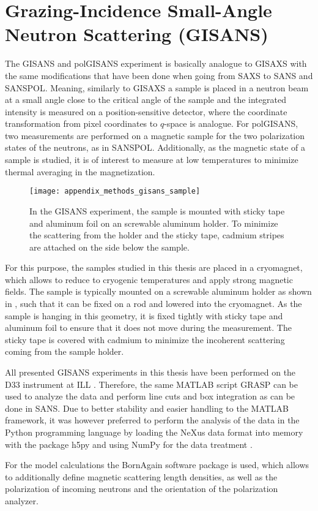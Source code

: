 \documentclass[\main/dresen_thesis.tex]{subfiles}
\begin{document}
  \section{Grazing-Incidence Small-Angle Neutron Scattering (GISANS)}
    \label{ch:methods:gisans}
    The GISANS and polGISANS experiment is basically analogue to GISAXS with the same modifications that have been done when going from SAXS to SANS and SANSPOL.
    Meaning, similarly to GISAXS a sample is placed in a neutron beam at a small angle close to the critical angle of the sample and the integrated intensity is measured on a position-sensitive detector, where the coordinate transformation from pixel coordinates to $q$-space is analogue.
    For polGISANS, two measurements are performed on a magnetic sample for the two polarization states of the neutrons, as in SANSPOL.
    Additionally, as the magnetic state of a sample is studied, it is of interest to measure at low temperatures to minimize thermal averaging in the magnetization.

    \begin{figure}[tb]
      \centering
      \texttt{[image: appendix\_methods\_gisans\_sample]}
      \caption{\label{fig:methods:gisans:samples}In the GISANS experiment, the sample is mounted with sticky tape and aluminum foil on an screwable aluminum holder. To minimize the scattering from the holder and the sticky tape, cadmium stripes are attached on the side below the sample.}
    \end{figure}

    For this purpose, the samples studied in this thesis are placed in a cryomagnet, which allows to reduce to cryogenic temperatures and apply strong magnetic fields.
    The sample is typically mounted on a screwable aluminum holder as shown in , such that it can be fixed on a rod and lowered into the cryomagnet.
    As the sample is hanging in this geometry, it is fixed tightly with sticky tape and aluminum foil to ensure that it does not move during the measurement.
    The sticky tape is covered with cadmium to minimize the incoherent scattering coming from the sample holder.

    All presented GISANS experiments in this thesis have been performed on the D33 instrument at ILL .
    Therefore, the same MATLAB script GRASP can be used to analyze the data and perform line cuts and box integration as can be done in SANS.
    Due to better stability and easier handling to the MATLAB framework, it was however preferred to perform the analysis of the data in the Python programming language by loading the NeXus data format into memory with the package h5py \cite{collette_2013_h5py} and using NumPy for the data treatment \cite{Oliphant_2006_Guide}.

    For the model calculations the BornAgain software package \cite{Burle_2018_borna} is used, which allows to additionally define magnetic scattering length densities, as well as the polarization of incoming neutrons and the orientation of the polarization analyzer.
\end{document}
